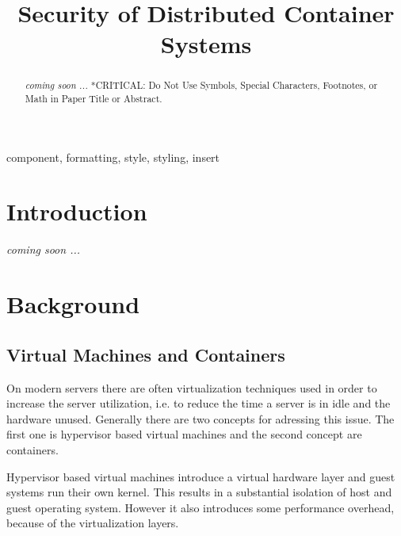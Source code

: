 \documentclass[conference]{IEEEtran}
\begin{document}
\title{Security of Distributed Container Systems}

\author{
}

\maketitle

\begin{abstract}
\textit{coming soon ...}
*CRITICAL: Do Not Use Symbols, Special Characters, Footnotes, 
or Math in Paper Title or Abstract.
\end{abstract}

\begin{IEEEkeywords}
component, formatting, style, styling, insert
\end{IEEEkeywords}

\section{Introduction}

\textit{coming soon ...}

\section{Background}

\subsection{Virtual Machines and Containers}

On modern servers there are often virtualization techniques used in order to increase the server utilization, i.e. to reduce the time a server is in idle and the hardware unused. Generally there are two concepts for adressing this issue. The first one is hypervisor based virtual machines and the second concept are containers.

Hypervisor based virtual machines introduce a virtual hardware layer and guest systems run their own kernel. This results in a substantial isolation of host and guest operating system. However it also introduces some performance overhead, because of the virtualization layers.
\end{document}
